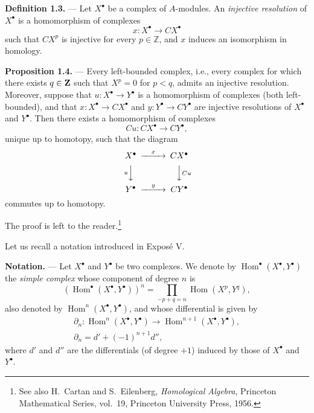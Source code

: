 \medskip
{}\noindent\textbf{Definition 1.3.} --- Let $X^\bullet$ be a complex of
$A$-modules. An \emph{injective resolution} of $X^\bullet$ is a homomorphism
of complexes
\[
  x\colon X^\bullet\longrightarrow CX^\bullet
\]
such that $CX^p$ is injective for every $p\in\mathbb Z$, and $x$ induces an
isomorphism in homology.


\noindent\textbf{Proposition 1.4.} --- Every left-bounded complex, i.e., every
complex for which there exists $q\in\mathbf Z$ such that $X^p=0$ for $p<q$, admits
an injective resolution. Moreover, suppose that
$u\colon X^\bullet\longrightarrow Y^\bullet$ is a homomorphism of complexes
(both left-bounded), and that
$x\colon X^\bullet\longrightarrow CX^\bullet$ and
$y\colon Y^\bullet\longrightarrow CY^\bullet$ are injective resolutions of
$X^\bullet$ and $Y^\bullet$. Then there exists a homomorphism of complexes
\[
  Cu\colon CX^\bullet\longrightarrow CY^\bullet,
\]
unique up to homotopy, such that the diagram
\[
\begin{CD}
X^\bullet @>{x}>> CX^\bullet \\
@V{u}VV @VV{Cu}V \\
Y^\bullet @>{y}>> CY^\bullet
\end{CD}
\]
commutes up to homotopy.


The proof is left to the reader.\footnote{See also H.~Cartan and
S.~Eilenberg, \emph{Homological Algebra}, Princeton Mathematical Series,
vol.~19, Princeton University Press, 1956.}

Let us recall a notation introduced in Expos\'e V.

\medskip
\noindent\textbf{Notation.} --- Let $X^\bullet$ and $Y^\bullet$ be two
complexes. We denote by $\operatorname{Hom}^\bullet(X^\bullet,Y^\bullet)$ the
\emph{simple complex} whose component of degree $n$ is
\[
  (\operatorname{Hom}^\bullet(X^\bullet,Y^\bullet))^n
  =\prod_{-p+q=n}\operatorname{Hom}(X^p,Y^q),
\]
also denoted by $\operatorname{Hom}^n(X^\bullet,Y^\bullet)$, and whose
differential is given by
\begin{gather*}
  \partial_n\colon
  \operatorname{Hom}^n(X^\bullet,Y^\bullet)
  \longrightarrow
  \operatorname{Hom}^{n+1}(X^\bullet,Y^\bullet),\\
  \partial_n=d'+(-1)^{n+1}d'',
\end{gather*}
where $d'$ and $d''$ are the differentials (of degree $+1$) induced by those
of $X^\bullet$ and $Y^\bullet$.

